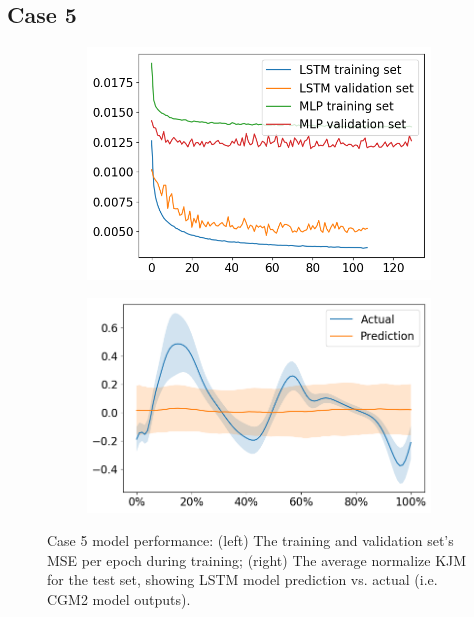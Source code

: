 \documentclass[../main.tex]{subfiles}
\begin{document}
\subsection{Case 5}
\label{sec:results-case5}

\begin{figure}[ht!]
     \centering
     \begin{subfigure}[b]{0.466\textwidth}
         \centering
         \includegraphics[width=\textwidth]{img/results/training_history/Case5_LSTMvsMLP_training.png}
     \end{subfigure}
     \hfill
     \begin{subfigure}[b]{0.524\textwidth}
         \centering
         \includegraphics[width=\textwidth]{img/results/test_prediction_evaluation/Case5_LSTM_test_prediction.png}
     \end{subfigure}
    \caption{Case 5 model performance: (left) The training and validation set's \ac{MSE} per epoch during training; (right) The average normalize \ac{KJM} for the test set, showing \ac{LSTM} model prediction vs. actual (i.e. CGM2 model outputs).}
    \label{fig:case5-performance-plots}
\end{figure}
\end{document}
